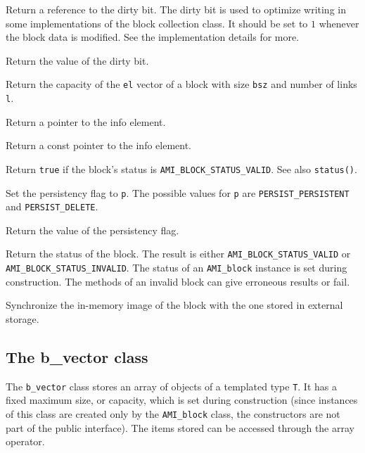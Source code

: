          {Return a reference to the dirty bit. The
        dirty bit is used to optimize writing in some implementations of
        the block collection class. It should be set to $1$ whenever the
        block data is modified. See the implementation details for more.}

         {Return the value of the dirty bit.}

        {Return the capacity of the \lstinline|el| vector of a block with size 
        \lstinline|bsz| and number of links \lstinline|l|.}

         {Return a pointer to the info element.}
        
         {Return a const pointer to the 
        info element.}

         {Return \lstinline|true| if the block's 
        status is \lstinline|AMI_BLOCK_STATUS_VALID|. See also \lstinline|status()|.}

         {Set the persistency flag to
        \lstinline|p|. The possible values for \lstinline|p| are \lstinline|PERSIST_PERSISTENT| and \lstinline|PERSIST_DELETE|.}

         {Return the value of the 
        persistency flag.} 

         {Return the status of the
        block. The result is either
        \lstinline|AMI_BLOCK_STATUS_VALID| or 
      \lstinline|AMI_BLOCK_STATUS_INVALID|. The status of an \lstinline|AMI_block|
        instance is set during construction. The methods of an invalid
        block can give erroneous results or fail.}

         {Synchronize the in-memory image of the
        block with the one stored in external storage.}

   \etabb

\subsection{The  b\_vector class}

The \lstinline|b_vector| class stores an array of objects of a templated type
\lstinline|T|. It has a fixed maximum size, or capacity, which is set during
construction (since instances of this class are created only by the
\lstinline|AMI_block| class, the constructors are not part of the public
interface). The items stored can be accessed through the array operator.

